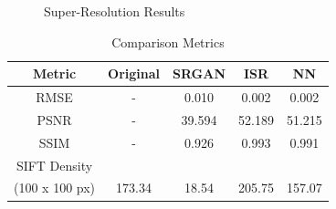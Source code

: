 \documentclass[conference]{IEEEtran}
\begin{document}
\begin{figure}[htbp]
    \caption{Super-Resolution Results}
    \label{compare}
\end{figure}





\setlength{\tabcolsep}{10pt} %
\renewcommand{\arraystretch}{1.5} %
\begin{table}[h!]
    \caption{Comparison Metrics}
    \centering
     \begin{tabular}{ c c c c c } 
     \hline
     Metric & Original & SRGAN & ISR & NN \\ [1ex] 
     \hline
     RMSE & - & 0.010 & 0.002 & 0.002 \\ 
     PSNR & - & 39.594 & 52.189 & 51.215 \\
     SSIM & - & 0.926 & 0.993 & 0.991 \\
     SIFT Density \\ (100 x 100 px) & 173.34 & 18.54 & 205.75 & 157.07 \\
     \hline
     \end{tabular}
\end{table}
\end{document}
